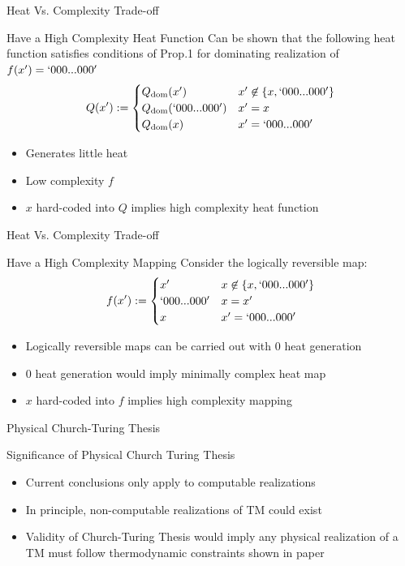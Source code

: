 \documentclass{beamer}
\begin{document}
\begin{frame}{Heat Vs. Complexity Trade-off}
\begin{block}{Have a High Complexity Heat Function}
Can be shown that the following heat function satisfies conditions of Prop.1 for dominating realization of $f(x') = `000...000'$
\begin{equation*}
    Q(x') := \begin{cases} Q_\text{dom}(x') &x'\not\in \{x,`000...000'\}\\
    Q_\text{dom}(`000...000') &x' =x\\
    Q_\text{dom}(x) &x' = `000...000'\end{cases}
\end{equation*}
\begin{itemize}
    \item Generates little heat
    \item Low complexity $f$
    \item $x$ hard-coded into $Q$ implies high complexity heat function
\end{itemize}
\end{block}
\end{frame}

\begin{frame}{Heat Vs. Complexity Trade-off}
\begin{block}{Have a High Complexity Mapping}
Consider the logically reversible map:
\begin{equation*}
    f(x') := \begin{cases} x' & x\not\in \{x,`000...000'\}\\
    `000...000' & x=x'\\
    x & x'= `000...000'\end{cases}
\end{equation*}
\begin{itemize}
    \item Logically reversible maps can be carried out with 0 heat generation
    \item 0 heat generation would imply minimally complex heat map
    \item $x$ hard-coded into $f$ implies high complexity mapping
\end{itemize}
\end{block}
\end{frame}

\begin{frame}{Physical Church-Turing Thesis}
\begin{block}{Significance of Physical Church Turing Thesis}
\begin{itemize}
    \item Current conclusions only apply to computable realizations
    \item In principle, non-computable realizations of TM could exist 
    \item Validity of Church-Turing Thesis would imply any physical realization of a TM must follow thermodynamic constraints shown in paper
\end{itemize}
\end{block}
\end{frame}
\end{document}
